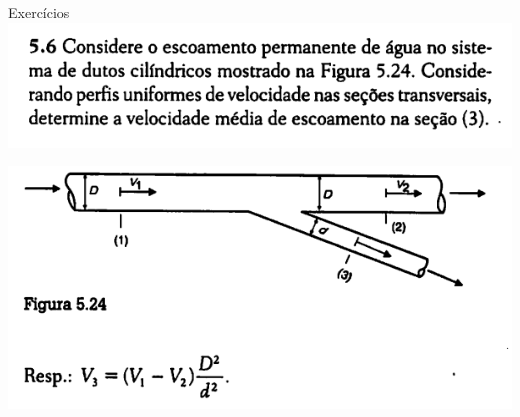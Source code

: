 \documentclass[t,%
brazilian,%
11pt,%
aspectratio=169,%
table%
]{beamer}
\begin{document}

\begin{frame}{Exercícios}
    \includegraphics[height=0.3\textheight-14pt]{images/Captura de tela de 2025-04-23 17-29-10.png}

    \includegraphics[height=0.5\textheight-14pt]{images/Captura de tela de 2025-04-23 17-29-19.png}
\end{frame}
\end{document}
